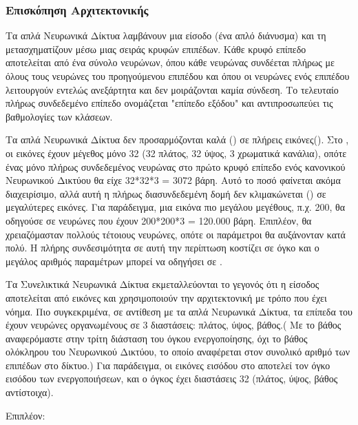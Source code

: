 \subsubsection{Επισκόπηση Αρχιτεκτονικής}

Τα απλά Νευρωνικά Δίκτυα λαμβάνουν μια είσοδο (ένα απλό διάνυσμα) και τη μετασχηματίζουν μέσω μιας σειράς κρυφών επιπέδων. Κάθε κρυφό επίπεδο αποτελείται από ένα σύνολο νευρώνων, όπου κάθε νευρώνας συνδέεται πλήρως με όλους τους νευρώνες του προηγούμενου επιπέδου και όπου οι νευρώνες ενός επιπέδου λειτουργούν εντελώς ανεξάρτητα και δεν μοιράζονται καμία σύνδεση. Το τελευταίο πλήρως συνδεδεμένο επίπεδο ονομάζεται "επίπεδο εξόδου" και αντιπροσωπεύει τις βαθμολογίες των κλάσεων.

Τα απλά Νευρωνικά Δίκτυα δεν προσαρμόζονται καλά () σε πλήρεις εικόνες(). Στο , οι εικόνες έχουν μέγεθος μόνο 32 (32 πλάτος, 32 ύψος, 3 χρωματικά κανάλια), οπότε ένας μόνο πλήρως συνδεδεμένος νευρώνας στο πρώτο κρυφό επίπεδο ενός κανονικού Νευρωνικού Δικτύου θα είχε 32*32*3 = 3072 βάρη. Αυτό το ποσό φαίνεται ακόμα διαχειρίσιμο, αλλά αυτή η πλήρως διασυνδεδεμένη δομή δεν κλιμακώνεται () σε μεγαλύτερες εικόνες. Για παράδειγμα, μια εικόνα πιο μεγάλου μεγέθους, π.χ. 200, θα οδηγούσε σε νευρώνες που έχουν 200*200*3 = 120.000 βάρη. Επιπλέον, θα χρειαζόμασταν πολλούς  τέτοιους νευρώνες, οπότε οι παράμετροι θα αυξάνονταν κατά πολύ. Η πλήρης συνδεσιμότητα σε αυτή την περίπτωση κοστίζει σε όγκο και ο μεγάλος αριθμός παραμέτρων μπορεί  να οδηγήσει σε .

Τα Συνελικτικά Νευρωνικά Δίκτυα εκμεταλλεύονται το γεγονός ότι η είσοδος αποτελείται από εικόνες και χρησιμοποιούν την αρχιτεκτονική με τρόπο που έχει νόημα. Πιο συγκεκριμένα, σε αντίθεση με τα απλά Νευρωνικά Δίκτυα, τα επίπεδα του  έχουν νευρώνες οργανωμένους σε 3 διαστάσεις: πλάτος, ύψος, βάθος.( Με το βάθος αναφερόμαστε στην τρίτη διάσταση του όγκου ενεργοποίησης, όχι το βάθος ολόκληρου του Νευρωνικού Δικτύου, το οποίο αναφέρεται στον συνολικό αριθμό των επιπέδων στο δίκτυο.) Για παράδειγμα, οι εικόνες εισόδου στο  αποτελεί τον όγκο εισόδου των ενεργοποιήσεων, και ο όγκος έχει διαστάσεις 32 (πλάτος, ύψος, βάθος αντίστοιχα). 

Επιπλέον:

\subsection{}

